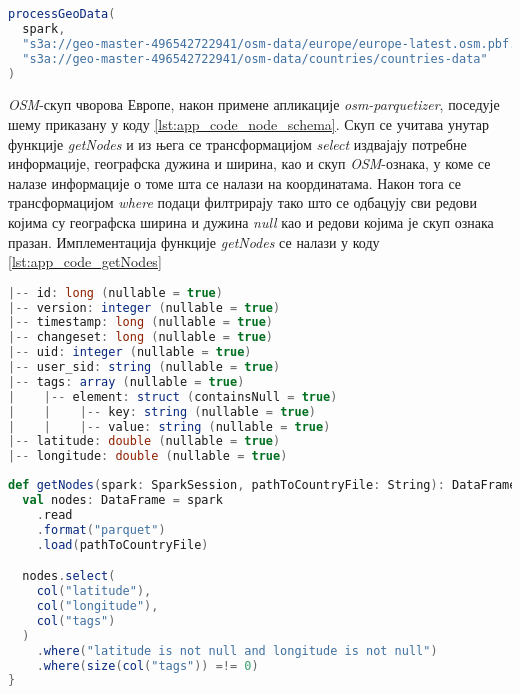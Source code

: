 \documentclass[12pt,oneside]{memoir}
\begin{document}
\begin{lstlisting}[caption={Позивање функције која започиње обраду података}, language=Scala, label={lst:app_code_main_processGeoData}]
processGeoData(
  spark,
  "s3a://geo-master-496542722941/osm-data/europe/europe-latest.osm.pbf.node.parquet",
  "s3a://geo-master-496542722941/osm-data/countries/countries-data"
)
\end{lstlisting}

\textit{OSM}-скуп чворова Европе, након примене апликације \textit{osm-parquetizer}, поседује шему приказану у коду \ref{lst:app_code_node_schema}. Скуп се учитава унутар функције \textit{getNodes} и из њега се трансформацијом \textit{select} издвајају потребне информације, географска дужина и ширина, као и скуп \textit{OSM}-ознака, у коме се налазе информације о томе шта се налази на координатама. Након тога се трансформацијом \textit{where} подаци филтрирају тако што се одбацују сви редови којима су географска ширина и дужина \textit{null} као и редови којима је скуп ознака празан. Имплементација функције \textit{getNodes} се налази у коду \ref{lst:app_code_getNodes}

\begin{lstlisting}[caption={Шема \textit{OSM}-скупа чворова након примене апликације \textit{osm-parquetizer}}, language=Scala, label={lst:app_code_node_schema}]
|-- id: long (nullable = true)
|-- version: integer (nullable = true)
|-- timestamp: long (nullable = true)
|-- changeset: long (nullable = true)
|-- uid: integer (nullable = true)
|-- user_sid: string (nullable = true)
|-- tags: array (nullable = true)
|    |-- element: struct (containsNull = true)
|    |    |-- key: string (nullable = true)
|    |    |-- value: string (nullable = true)
|-- latitude: double (nullable = true)
|-- longitude: double (nullable = true)
\end{lstlisting}

\begin{lstlisting}[caption={Функција која учитава податке и извршава иницијално филтрирање колона и редова}, language=Scala, label={lst:app_code_getNodes}]
def getNodes(spark: SparkSession, pathToCountryFile: String): DataFrame = {
  val nodes: DataFrame = spark
    .read
    .format("parquet")
    .load(pathToCountryFile)

  nodes.select(
    col("latitude"),
    col("longitude"),
    col("tags")
  )
    .where("latitude is not null and longitude is not null")
    .where(size(col("tags")) =!= 0)
}
\end{lstlisting}
\end{document}
